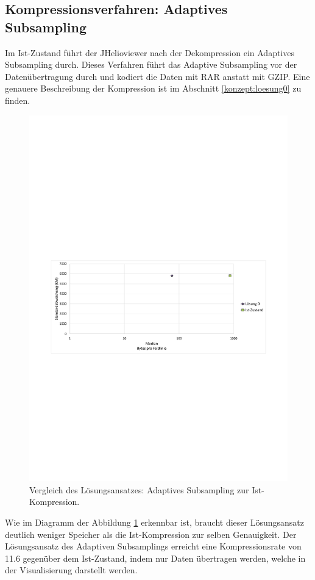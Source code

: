 \subsection{Kompressionsverfahren: Adaptives Subsampling} \label{resultate:loesung0}
Im Ist-Zustand führt der JHelioviewer nach der Dekompression ein Adaptives Subsampling durch. Dieses Verfahren führt das Adaptive Subsampling vor der Datenübertragung durch und kodiert die Daten mit RAR anstatt mit GZIP. Eine genauere Beschreibung der Kompression ist im Abschnitt \ref{konzept:loesung0} zu finden.

\begin{figure}[!htbp]
	\center
	\includegraphics[trim = 1.8cm 10.8cm 1.8cm 12.2cm, clip=true, width=1\textwidth,keepaspectratio]{./pictures/resultate/loesung0/loesung0_0.pdf}
	\caption{Vergleich des Lösungsansatzes: Adaptives Subsampling zur Ist-Kompression.}
	\label{resultate:loesung0:loesung0_0}
\end{figure}
Wie im Diagramm der Abbildung \ref{resultate:loesung0:loesung0_0} erkennbar ist, braucht dieser Lösungsansatz deutlich weniger Speicher als die Ist-Kompression zur selben Genauigkeit. Der Lösungsansatz des Adaptiven Subsamplings erreicht eine Kompressionsrate von 11.6 gegenüber dem Ist-Zustand, indem nur Daten übertragen werden, welche in der Visualisierung darstellt werden.

